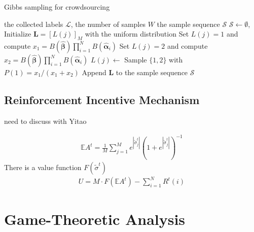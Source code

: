 \documentclass{article}
\begin{document}
\begin{algorithm}[tb]
   \caption{Gibbs sampling for crowdsourcing}
   \label{GSC}
   \small
\begin{algorithmic}
   \vspace{0.5mm}
    the collected labels $\mathcal{L}$, the number of samples $W$
    the sample sequence $\mathcal{S}$
   \vspace{0.5mm}
   \STATE $\mathcal{S}\leftarrow\emptyset$, Initialize $\bm{L}=[L(j)]_M$ with the uniform distribution
   \STATE Set $L(j)=1$ and compute $x_1= B(\hat{\bm{\beta}})\prod_{i=1}^{N}B(\hat{\bm{\alpha}}_{i})$
   \STATE Set $L(j)=2$ and compute $x_2= B(\hat{\bm{\beta}})\prod_{i=1}^{N}B(\hat{\bm{\alpha}}_{i})$
   \STATE $L(j)\leftarrow$ Sample $\{1,2\}$ with $P(1)=x_1/(x_1+x_2)$
   \ENDFOR
   \STATE Append $\bm{L}$ to the sample sequence $\mathcal{S}$
   \ENDFOR
\end{algorithmic}
\end{algorithm}


\subsection{Reinforcement Incentive Mechanism}
need to discuss with Yitao

\begin{equation}
\label{vot}
\begin{split}
\mathbb{E}A^t = \frac{1}{M}{\sum}_{j=1}^{M}e^{|\tilde{\sigma}_j^{t}|}(1+e^{|\tilde{\sigma}_j^{t}|})^{-1}
\end{split}
\end{equation}
There is a value function $F(\tilde{\sigma}^t)$
\begin{equation}
\label{utility}
\begin{split}
U = M\cdot F(\mathbb{E}A^t ) - \sum_{i=1}^{N}R^t(i)
\end{split}
\end{equation}


\section{Game-Theoretic Analysis}
\end{document}
